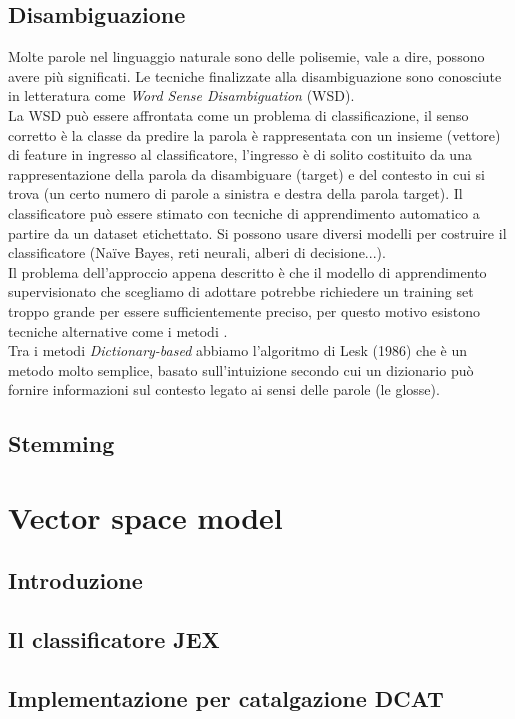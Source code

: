\documentclass{article}
\theoremstyle{plain}
\theoremstyle{definition}
\begin{document}
\subsection{Disambiguazione}
Molte parole nel linguaggio naturale sono delle polisemie, vale a dire, possono avere più significati. Le tecniche finalizzate alla disambiguazione sono conosciute in letteratura come \textit{Word Sense Disambiguation} (WSD).
\\
La WSD può essere affrontata come un problema di classificazione, il senso
corretto è la classe da predire la parola è rappresentata con un insieme (vettore) di feature in ingresso al classificatore, l'ingresso è di solito costituito da una rappresentazione della parola da disambiguare (target) e del 
contesto in cui si trova (un certo numero di parole a sinistra e destra della
parola target). Il classificatore può essere stimato con tecniche di apprendimento automatico a partire da un dataset etichettato. Si possono usare diversi modelli per costruire il classificatore (Naïve Bayes, reti neurali, alberi di decisione...).
\\
Il problema dell'approccio appena descritto è che il modello di apprendimento supervisionato che scegliamo di adottare potrebbe richiedere un training set troppo grande per essere sufficientemente preciso, per questo motivo esistono tecniche alternative come i metodi .
\\
Tra i metodi \textit{Dictionary-based} abbiamo l'algoritmo di Lesk (1986) che è un metodo molto semplice, basato sull'intuizione secondo cui un dizionario può fornire informazioni sul contesto legato ai sensi delle parole (le glosse).  

 
\subsection{Stemming}

\newpage
\section{Vector space model}
\subsection{Introduzione}
\subsection{Il classificatore JEX}
\subsection{Implementazione per catalgazione DCAT}
\end{document}
